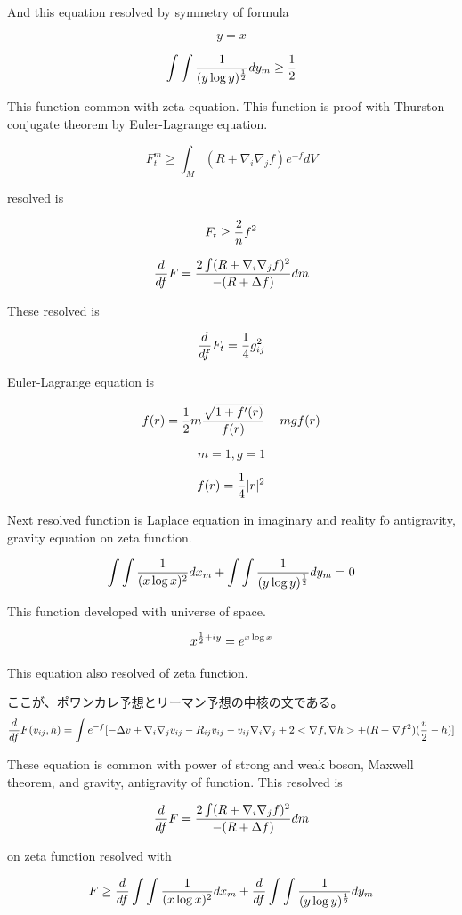 \documentclass{jsarticle}
\begin{document}
{  And this equation resolved by symmetry of formula

  $$ y = x $$

  $$ \int \int {1 \over (y \log y)^{1 \over 2}}dy_{m} \ge {1 \over 2} $$

  This function common with zeta equation. This function is proof with Thurston conjugate theorem by Euler-Lagrange
equation.

  $$ F^m_{t} \ge \int_{M} (R + \nabla_{i} \nabla_{j} f)e^{-f}dV $$

  resolved is

  $$ F_{t} \ge {2 \over n}f^2  $$

  $$ {d \over df}F = {2 \int (R + \nabla_{i} \nabla_{j} f)^2 \over - (R + \Delta f)}dm $$

  These resolved is

  $$ {d \over df}F_{t} = {1 \over 4}g^2_{ij} $$

  Euler-Lagrange equation is

  $$ f(r) = {1 \over 2}m{\sqrt{1 + f'(r)} \over f(r)} - mgf(r) $$

  $$ m = 1, g = 1 $$

  $$ f(r) = {1 \over 4}|r|^2 $$

  Next resolved function is Laplace equation in imaginary and reality fo antigravity, gravity equation on
zeta function.

$$ \int \int {1 \over (x \log x)^2}dx_{m} + \int \int {1 \over (y \log y)^{1 \over 2}}dy_{m} = 0  $$

  This function developed with universe of space.

  $$ x^{{1 \over 2} + iy} = e^{x \log x} $$
  
  This equation also resolved of zeta function.

  ここが、ポワンカレ予想とリーマン予想の中核の文である。
  $$ {d \over df} F(v_{ij},h) = \int e^{-f} [- \Delta v + \nabla_{i} \nabla_{j} v_{ij} - R_{ij} v_{ij} 
  - v_{ij} \nabla_{i} \nabla_{j} + 2 < \nabla f, \nabla h> + (R + \nabla f^2)({v \over 2} - h)]  $$

  These equation is common with power of strong and weak boson, Maxwell theorem, and gravity, antigravity
of function. This resolved is

$$ {d \over df}F = {2 \int (R + \nabla_{i} \nabla_{j} f)^2 \over - (R + \Delta f)}dm $$

  on zeta function resolved with

  $$ F \ge {d \over df} \int \int {1 \over (x \log x)^2}dx_{m} + {d \over df} \int \int {1 \over (y \log y)^{1 \over 2}
  }dy_{m} $$


}
\end{document}
